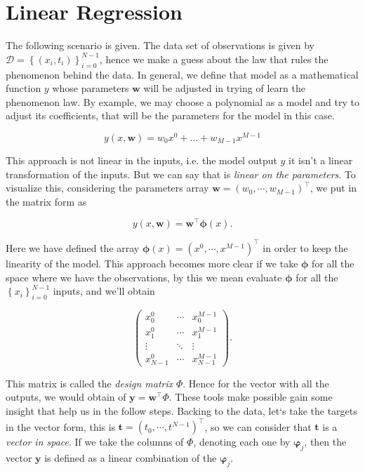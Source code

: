 \documentclass[11pt]{article} %
\begin{document}
\section{Linear Regression}

The following scenario is given. The data set of observations is given by $\mathcal{D} = \left\{ \left( x_i,t_i \right) \right\}_{i=0}^{N-1}$, hence we make a guess about the law that rules the phenomenon behind the data. In general, we define that model as a mathematical function $y$ whose parameters $\mathbf{w}$ will be adjusted in trying of learn the phenomenon law. By example, we may choose a polynomial as a model and try to adjust its coefficients, that will be the parameters for the model in this case.

\begin{equation}
   y\left( x,\mathbf{w} \right) = w_0 x^0 + \dots + w_{M-1} x^{M-1}
\end{equation}

This approach is not linear in the inputs, i.e. the model output $y$ it isn't a linear transformation of the inputs. But we can say that is \textit{linear on the parameters}. To visualize this, considering the parameters array $\mathbf{w} = \left( w_0, \cdots , w_{M-1} \right)^\top$, we put in the matrix form as 

\begin{equation}
   y\left( x,\mathbf{w} \right) = \mathbf{w}^\top \boldsymbol{\phi}(x).
\end{equation}

Here we have defined the array $\boldsymbol{\phi}(x) = \left( x^0, \cdots , x^{M-1} \right)^\top$ in order to keep the linearity of the model. This approach becomes more clear if we take $\boldsymbol{\phi}$ for all the space where we have the observations, by this we mean evaluate $\boldsymbol{\phi}$ for all the $\left\{ x_i \right\}_{i=0}^{N-1}$ inputs, and we'll obtain

\begin{equation}
   \begin{pmatrix}
      x^0_0 & \cdots & x^{M-1}_0 \\
      x^0_1 & \cdots & x^{M-1}_1 \\
      \vdots & \ddots & \vdots \\
      x^0_{N-1} & \cdots & x^{M-1}_{N-1}
   \end{pmatrix}.
\end{equation}

This matrix is called the \textit{design matrix} $\Phi$. Hence for the vector with all the outputs, we would obtain of $\mathbf{y} = \mathbf{w}^\top \Phi$. These tools make possible gain some insight that help us in the follow steps. Backing to the data, let`s take the targets in the vector form, this is $\mathbf{t} = \left( t_0 , \cdots , t^{N-1} \right)^\top$, so we can consider that $\mathbf{t}$ is a \textit{vector in space}\cite{Bishop:2006:PRM:1162264}. If we take the columns of $\Phi$, denoting each one by $\boldsymbol{\varphi}_j$, then the vector $\mathbf{y}$ is defined as a linear combination of the $\boldsymbol{\varphi}_j$. 
\end{document}
